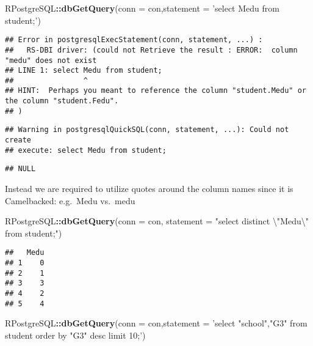 \documentclass[]{book}
\newenvironment{Shaded}{\begin{snugshade}}{\end{snugshade}}
\newcommand{\KeywordTok}[1]{\textcolor[rgb]{0.13,0.29,0.53}{\textbf{#1}}}
\newcommand{\DataTypeTok}[1]{\textcolor[rgb]{0.13,0.29,0.53}{#1}}
\newcommand{\CharTok}[1]{\textcolor[rgb]{0.31,0.60,0.02}{#1}}
\newcommand{\StringTok}[1]{\textcolor[rgb]{0.31,0.60,0.02}{#1}}
\newcommand{\OperatorTok}[1]{\textcolor[rgb]{0.81,0.36,0.00}{\textbf{#1}}}
\newcommand{\NormalTok}[1]{#1}
\begin{document}
\begin{Shaded}
\begin{Highlighting}[]
\NormalTok{RPostgreSQL}\OperatorTok{::}\KeywordTok{dbGetQuery}\NormalTok{(}\DataTypeTok{conn =}\NormalTok{ con,}\DataTypeTok{statement =} \StringTok{'select Medu from student;'}\NormalTok{)}
\end{Highlighting}
\end{Shaded}

\begin{verbatim}
## Error in postgresqlExecStatement(conn, statement, ...) : 
##   RS-DBI driver: (could not Retrieve the result : ERROR:  column "medu" does not exist
## LINE 1: select Medu from student;
##                ^
## HINT:  Perhaps you meant to reference the column "student.Medu" or the column "student.Fedu".
## )
\end{verbatim}

\begin{verbatim}
## Warning in postgresqlQuickSQL(conn, statement, ...): Could not create
## execute: select Medu from student;
\end{verbatim}

\begin{verbatim}
## NULL
\end{verbatim}

Instead we are required to utilize quotes around the column names since
it is Camelbacked: e.g.~Medu vs.~medu

\begin{Shaded}
\begin{Highlighting}[]
\NormalTok{RPostgreSQL}\OperatorTok{::}\KeywordTok{dbGetQuery}\NormalTok{(}\DataTypeTok{conn =}\NormalTok{ con, }\DataTypeTok{statement =} \StringTok{"select distinct }\CharTok{\textbackslash{}"}\StringTok{Medu}\CharTok{\textbackslash{}"}\StringTok{ from student;"}\NormalTok{)}
\end{Highlighting}
\end{Shaded}

\begin{verbatim}
##   Medu
## 1    0
## 2    1
## 3    3
## 4    2
## 5    4
\end{verbatim}

\begin{Shaded}
\begin{Highlighting}[]
\NormalTok{RPostgreSQL}\OperatorTok{::}\KeywordTok{dbGetQuery}\NormalTok{(}\DataTypeTok{conn =}\NormalTok{ con,}\DataTypeTok{statement =} \StringTok{'select "school","G3" from student order by "G3" desc limit 10;'}\NormalTok{)}
\end{Highlighting}
\end{Shaded}
\end{document}
